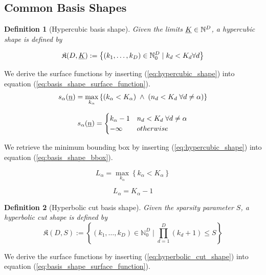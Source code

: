 \documentclass{article}
\newtheorem*{definition}{Definition}
\begin{document}
\subsection{Common Basis Shapes}
\begin{definition}[Hypercubic basis shape]
  Given the limits \(\underline{K} \in \mathbb{N}^D\), a hypercubic shape is defined by

  \begin{equation}
    \label{eq:hypercubic_shape}
    \mathfrak{K}(D,\underline{K}):=\left\{(k_1,\dots,k_D) \in \mathbb{N}_0^D \;|\; k_d < K_d \forall d\right\}
  \end{equation}
\end{definition}

We derive the surface functions by inserting (\ref{eq:hypercubic_shape}) into
equation
(\ref{eq:basis_shape_surface_function}).
\[
  s_{\alpha}(\underline{n})=\max_{k_{\alpha}}\left\{(k_{\alpha}<K_{\alpha}) \;\land\;
    (n_d < K_d \;\forall d \neq \alpha)\right\}
\]

\begin{equation}
  s_{\alpha}(\underline{n})=
  \begin{cases}
    k_{\alpha}-1 & n_d < K_d \;\forall d \neq \alpha \\
    -\infty & otherwise \\
  \end{cases}
\end{equation}

We retrieve the minimum bounding box by inserting (\ref{eq:hypercubic_shape}) into
equation
(\ref{eq:basis_shape_bbox}).

\[
L_{\alpha}=\max_{k_{\alpha}}\left\{k_{\alpha}<K_{\alpha}\right\}
\]

\begin{equation}
L_{\alpha}=K_{\alpha}-1
\end{equation}

\begin{definition}[Hyperbolic cut basis shape]
  Given the sparsity parameter \(S\), a hyperbolic cut shape is defined by
  \begin{equation}
    \mathfrak{K}(D,S):=\left\{(k_1,\dots,k_D) \in \mathbb{N}_0^D \;|\;\prod_{d=1}^D(k_d+1) \leq S\right\}
    \label{eq:hyperbolic_cut_shape}
  \end{equation}
\end{definition}

We derive the surface functions by inserting (\ref{eq:hyperbolic_cut_shape}) into
equation (\ref{eq:basis_shape_surface_function}).
\end{document}
